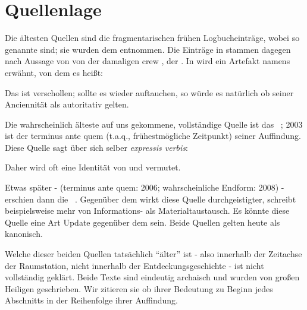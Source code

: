 \section{Quellenlage}%

Die ältesten Quellen sind die fragmentarischen frühen Logbucheinträge, wobei \cite{cbaselogbuchpre} so genannte  sind; sie wurden dem  entnommen.  Die Einträge in \cite{cbaselogbuchnow} stammen dagegen nach Aussage von \cite{cbaselogbuchpre} von der damaligen crew \cite{cbaselogbuchpre}, der . In \cite{cbaselogbuchnow} wird ein Artefakt namens  erwähnt, von dem es heißt: 

 
 Das  ist verschollen; sollte es wieder auftauchen, so würde es natürlich ob seiner Anciennität als autoritativ gelten.
 
Die wahrscheinlich älteste auf uns gekommene, vollständige Quelle ist das ~\cite{cbasestarbasemanual}; 2003 ist der terminus ante quem (t.a.q., frühestmögliche Zeitpunkt) seiner Auffindung. Diese Quelle sagt über sich selber \emph{expressis verbis}:

Daher wird oft eine Identität von  und  vermutet. %

Etwas später - (terminus ante quem: 2006; wahrscheinliche Endform: 2008) - erschien dann die ~\cite{ctour}. Gegenüber dem  wirkt diese Quelle durchgeistigter, schreibt beispielsweise mehr von Informations- als Materialtaustausch. Es könnte diese Quelle eine Art Update gegenüber dem  sein. Beide Quellen gelten heute als kanonisch.

Welche dieser beiden Quellen tatsächlich "`älter"' ist - also innerhalb der Zeitachse der Raumstation, nicht innerhalb der Entdeckungsgeschichte - ist nicht vollständig geklärt. 
Beide Texte sind eindeutig archaisch und wurden von großen Heiligen geschrieben.  Wir zitieren sie ob ihrer Bedeutung zu Beginn jedes Abschnitts in der Reihenfolge ihrer Auffindung.

